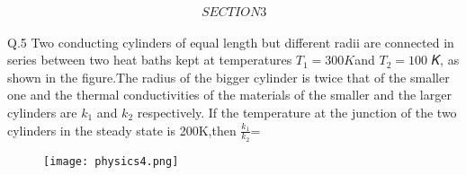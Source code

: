 \documentclass[11pt]{article}
\begin{document}
                      $$SECTION3$$\\                                      
Q.5 Two conducting cylinders of equal length but different radii are connected in series between two heat baths kept at temperatures $T_1=300K$and $T_2=100$ 𝐾, as shown in the figure.The radius of the bigger cylinder is twice that of the smaller one and the thermal conductivities of the materials of the smaller and the larger cylinders are $k_1$ and $k_2$ respectively. If the temperature at the junction of the two cylinders in the steady state is 200K,then $\frac{k_1}{k_2}$=

\newpage
\begin{center}
\begin{figure}
\texttt{[image: physics4.png]}
\end{figure}
\end{center}
\end{document}
